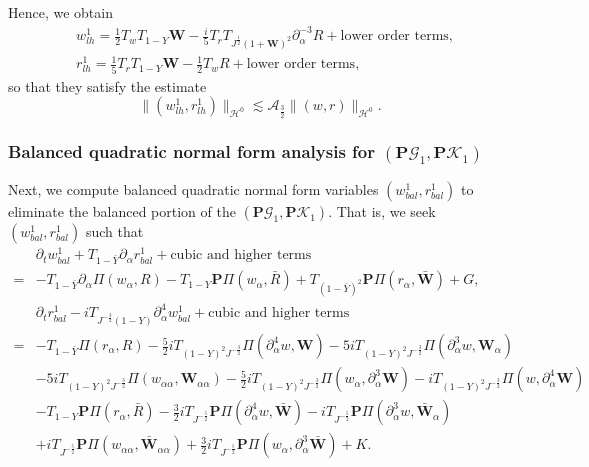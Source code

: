 \documentclass[10pt]{amsart}
\theoremstyle{remark}
\theoremstyle{definition}
\numberwithin{equation}{section}
\newcommand{\p}{\partial}
\renewcommand{\H}{{\mathcal H }}
\newcommand{\al}{\alpha}
\newcommand{\f}{\frac}
\newcommand{\bw}{\mathbf{W}}
\newcommand{\nP}{{\mathbf P}}
\begin{document}
Hence, we obtain
\begin{align*}
    &w^1_{lh} = \f12 T_{w}T_{1-Y}\bw - \f{i}{5} T_{r}  T_{J^{\frac{1}{2}}(1+\bw)^2} \p_\al^{-3} R + \text{lower order terms},\\
    &r^1_{lh} = \f15 T_{r}T_{1-Y}\bw-\f12 T_{w}  R + \text{lower order terms},
\end{align*}
so that they satisfy the estimate
\begin{equation*}
    \|(w^1_{lh}, r^1_{lh})\|_{\H^0} \lesssim \mathcal{A}_{\f32}\|(w,r)\|_{\H^0}.
\end{equation*}

\subsubsection{Balanced quadratic normal form analysis for $(\nP\mathcal{G}_1, \nP\mathcal{K}_1)$} 
Next, we compute balanced quadratic normal form variables $(w^1_{bal}, r^1_{bal})$ to eliminate the balanced portion of the $(\nP\mathcal{G}_1, \nP\mathcal{K}_1)$. That is, we seek $(w^1_{bal}, r^1_{bal})$ such that
\begin{align*}
 &\p_tw^1_{bal}+T_{1-\bar{Y}}\p_\al r^1_{bal} + \text{cubic and higher terms}\\
 =&  - T_{1-\bar{Y}}\p_\al\Pi(w_\al, R)- T_{1-Y}\nP\Pi(w_\al, \bar{R}) + T_{(1-\bar{Y})^2}\nP \Pi(r_\al, \bar{\bw}) +G,\\
&\p_tr^1_{bal}-iT_{J^{-\frac{3}{2}}(1-Y)}\p_\al^4w^1_{bal} + \text{cubic and higher terms}\\
=& -T_{1-\bar{Y}}\Pi(r_{\al},R) -\f52iT_{(1-Y)^2J^{-\f32}}\Pi(\p_{\al}^4w, \bw) -5iT_{(1-Y)^2J^{-\f32}}\Pi(\p^3_{\al}w,\mathbf{W}_{\al}) \\
&-5iT_{(1-Y)^2J^{-\f32}}\Pi(w_{\al\al},\mathbf{W}_{\al\al}) -\f52i T_{(1-Y)^2J^{-\f32}}\Pi(w_{\al},\p^3_{\al}\mathbf{W}) -iT_{(1-Y)^2J^{-\f32}}\Pi(w,\p^4_{\al}\mathbf{W})\\
&-T_{1-Y}\nP\Pi(r_{\al},\bar{R})-\f32i  T_{J^{-\f52}} \nP\Pi(\p^4_{\al}w,\bar{\bw})-iT_{J^{-\f52}}\nP\Pi(\p^3_{\al}w,\bar{\bw}_{\al})\\
&+iT_{J^{-\f52}}\nP\Pi(w_{\al\al},\bar{\mathbf{W}}_{\al\al}) +\f32iT_{J^{-\f52}}\nP\Pi(w_{\al},\p^3_{\al}\bar{\mathbf{W}}) + K.   
\end{align*}
\end{document}
